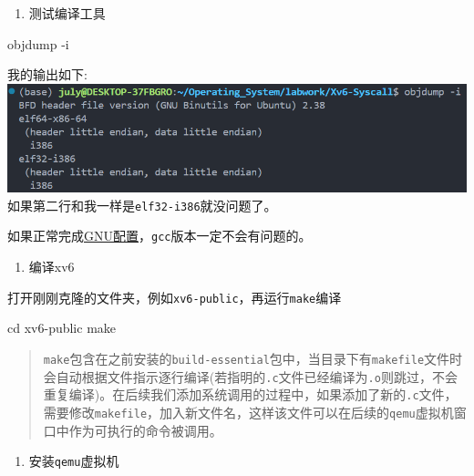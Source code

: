 \documentclass[
]{article}
\newenvironment{Shaded}{}{}
\newcommand{\AttributeTok}[1]{\textcolor[rgb]{0.49,0.56,0.16}{#1}}
\newcommand{\BuiltInTok}[1]{\textcolor[rgb]{0.00,0.50,0.00}{#1}}
\newcommand{\ExtensionTok}[1]{#1}
\newcommand{\FunctionTok}[1]{\textcolor[rgb]{0.02,0.16,0.49}{#1}}
\newcommand{\NormalTok}[1]{#1}
\begin{document}
\begin{enumerate}[resume]
	\def\labelenumi{\arabic{enumi}.}
	\item
	      测试编译工具
\end{enumerate}

\begin{Shaded}
	\begin{Highlighting}[]
		\ExtensionTok{objdump} \AttributeTok{{-}i}
	\end{Highlighting}
\end{Shaded}

我的输出如下:\\
\includegraphics{./README.assets/SPYQufIx9qhJFmy.png}\\
如果第二行和我一样是\texttt{elf32-i386}就没问题了。

如果正常完成\hyperref[GNU]{GNU配置}，\texttt{gcc}版本一定不会有问题的。

\begin{enumerate}[resume]
	\def\labelenumi{\arabic{enumi}.}
	\item
	      编译xv6
\end{enumerate}

打开刚刚克隆的文件夹，例如\texttt{xv6-public}，再运行\texttt{make}编译

\begin{Shaded}
	\begin{Highlighting}[]
		\BuiltInTok{cd}\NormalTok{ xv6{-}public}
		\FunctionTok{make}
	\end{Highlighting}
\end{Shaded}

\begin{quote}
	\texttt{make}包含在之前安装的\texttt{build-essential}包中，当目录下有\texttt{makefile}文件时会自动根据文件指示逐行编译(若指明的\texttt{.c}文件已经编译为\texttt{.o}则跳过，不会重复编译)。在后续我们添加系统调用的过程中，如果添加了新的\texttt{.c}文件，需要修改\texttt{makefile}，加入新文件名，这样该文件可以在后续的\texttt{qemu}虚拟机窗口中作为可执行的命令被调用。
\end{quote}

\begin{enumerate}[resume]
	\def\labelenumi{\arabic{enumi}.}
	\item
	      安装\texttt{qemu}虚拟机
\end{enumerate}
\end{document}
